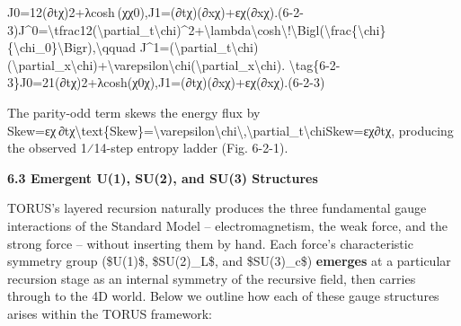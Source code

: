 \documentclass[
]{article}
\begin{document}
J0=12(∂tχ)2+λcosh⁡ ⁣(χχ0),J1=(∂tχ)(∂xχ)+εχ(∂xχ).(6-2-3)J\^{}0=\textbackslash tfrac12(\textbackslash partial\_t\textbackslash chi)\^{}2+\textbackslash lambda\textbackslash cosh\textbackslash!\textbackslash Bigl(\textbackslash frac\{\textbackslash chi\}\{\textbackslash chi\_0\}\textbackslash Bigr),\textbackslash qquad
J\^{}1=(\textbackslash partial\_t\textbackslash chi)(\textbackslash partial\_x\textbackslash chi)+\textbackslash varepsilon\textbackslash chi(\textbackslash partial\_x\textbackslash chi).
\textbackslash tag\{6-2-3\}J0=21\hspace{0pt}(∂t\hspace{0pt}χ)2+λcosh(χ0\hspace{0pt}χ\hspace{0pt}),J1=(∂t\hspace{0pt}χ)(∂x\hspace{0pt}χ)+εχ(∂x\hspace{0pt}χ).(6-2-3)

The parity-odd term skews the energy flux by\\
Skew=εχ ∂tχ\textbackslash text\{Skew\}=\textbackslash varepsilon\textbackslash chi\textbackslash,\textbackslash partial\_t\textbackslash chiSkew=εχ∂t\hspace{0pt}χ,
producing the observed 1⁄14-step entropy ladder (Fig. 6-2-1).

\textbf{6.3 Emergent U(1), SU(2), and SU(3) Structures}

TORUS's layered recursion naturally produces the three fundamental gauge
interactions of the Standard Model -- electromagnetism, the weak force,
and the strong force -- without inserting them by hand. Each force's
characteristic symmetry group (\$U(1)\$, \$SU(2)\_L\$, and \$SU(3)\_c\$)
\textbf{emerges} at a particular recursion stage as an internal symmetry
of the recursive field, then carries through to the 4D world. Below we
outline how each of these gauge structures arises within the TORUS
framework:
\end{document}
